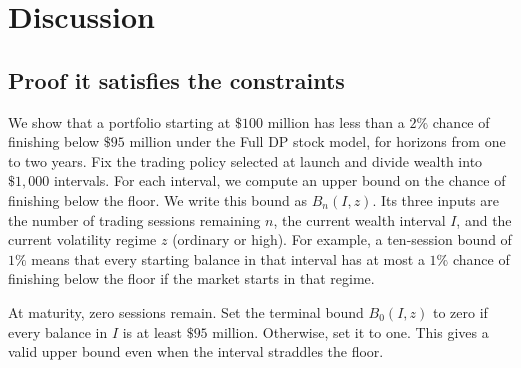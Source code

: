 \documentclass[10pt]{article}
\begin{document}
\begin{table}[!htbp]
 \centering
 \caption{Full DP and the representative of each alternative family, across all launches.}
 \label{tab:alternatives}
 \small
 
\end{table}

\FloatBarrier
\section{Discussion}
\subsection{Proof it satisfies the constraints}
We show that a portfolio starting at $\$100$ million has less than a $2\%$ chance of finishing below $\$95$ million under the Full DP stock model, for horizons from one to two years. Fix the trading policy selected at launch and divide wealth into $\$1{,}000$ intervals. For each interval, we compute an upper bound on the chance of finishing below the floor. We write this bound as $B_n(I,z)$. Its three inputs are the number of trading sessions remaining $n$, the current wealth interval $I$, and the current volatility regime $z$ (ordinary or high). For example, a ten-session bound of $1\%$ means that every starting balance in that interval has at most a $1\%$ chance of finishing below the floor if the market starts in that regime.

At maturity, zero sessions remain. Set the terminal bound $B_0(I,z)$ to zero if every balance in $I$ is at least $\$95$ million. Otherwise, set it to one. This gives a valid upper bound even when the interval straddles the floor.
\end{document}
